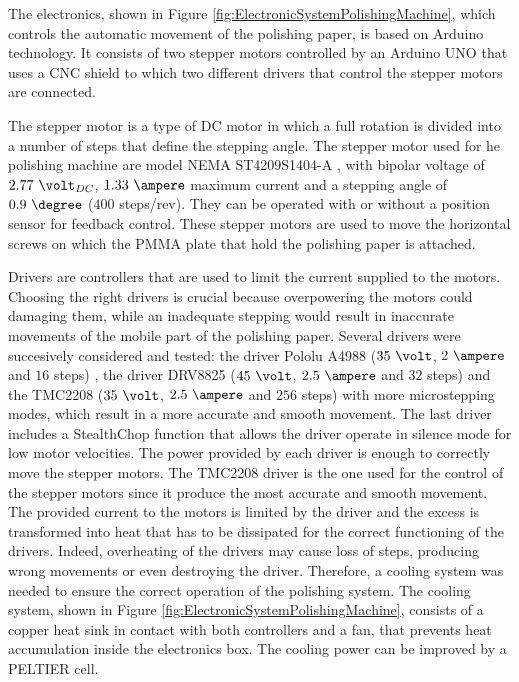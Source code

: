 The electronics, shown in Figure \ref{fig:ElectronicSystemPolishingMachine}, which controls the automatic movement of the polishing paper, is based on Arduino technology. It consists of two stepper motors controlled by an Arduino UNO \cite{ArduinoUNO} that uses a CNC shield \cite{CNCShield} to which two different drivers that control the stepper motors are connected.


The stepper motor is a type of DC motor in which a full rotation is divided into a number of steps that define the stepping angle. The stepper motor used for he polishing machine are model NEMA ST4209S1404-A \cite{StepperMotors}, with bipolar voltage of $2.77~\volt_{DC}$, $1.33~\ampere$ maximum current and a stepping angle of $0.9~\degree$ ($400$ steps/rev). They can be operated with or without a position sensor for feedback control. These stepper motors are used to move the horizontal screws on which the PMMA plate that hold the polishing paper is attached.

Drivers are controllers that are used to limit the current supplied to the motors. Choosing the right drivers is crucial because overpowering the motors could damaging them, while an inadequate stepping would result in inaccurate movements of the mobile part of the polishing paper. Several drivers were succesively considered and tested: the driver Pololu A4988 ($35~\volt$, $2~\ampere$ and $16$ steps) \cite{A4988Driver}, the driver DRV8825 ($45~\volt$, $2.5~\ampere$ and $32$ steps) \cite{DRV8825Driver} and the TMC2208 ($35~\volt$, $2.5~\ampere$ and $256$ steps) \cite{TMC2208Driver} with more microstepping modes, which result in a more accurate and smooth movement. The last driver includes a StealthChop function that allows the driver operate in silence mode for low motor velocities. The power provided by each driver is enough to correctly move the stepper motors. The TMC2208 driver is the one used for the control of the stepper motors since it produce the most accurate and smooth movement. The provided current to the motors is limited by the driver and the excess is transformed into heat that has to be dissipated for the correct functioning of the drivers. Indeed, overheating of the drivers may cause loss of steps, producing wrong movements or even destroying the driver. Therefore, a cooling system was needed to ensure the correct operation of the polishing system. The cooling system, shown in Figure \ref{fig:ElectronicSystemPolishingMachine}, consists of a copper heat sink in contact with both controllers and a fan, that prevents heat accumulation inside the electronics box. The cooling power can be improved by a PELTIER cell.

